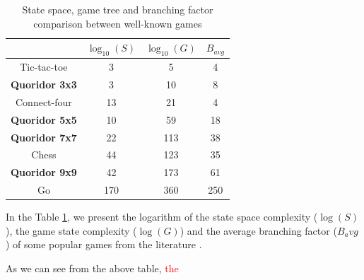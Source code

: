 \begin{table}[ht]
    \centering
     \begin{tabular}{|c|c|c|c|}\hline
          & $\log_{10}(S)$ & $\log_{10}(G)$ & $B_{avg}$\\ \hline 
          Tic-tac-toe  & 3   & 5   & 4    \\ \hline
  \textbf{Quoridor 3x3} & 3  & 10  & 8  \\ \hline
          Connect-four & 13  & 21  & 4    \\ \hline
  \textbf{Quoridor 5x5} & 10  & 59 & 18  \\ \hline
  \textbf{Quoridor 7x7}  & 22  & 113 & 38  \\ \hline
          Chess        & 44  & 123 & 35   \\ \hline
  \textbf{Quoridor 9x9}     & 42  & 173 & 61  \\ \hline        
          Go           & 170 & 360 & 250 \\ \hline
     \end{tabular}
     \caption{State space, game tree and branching factor comparison between well-known games}
     \label{tab:comparison}
 \end{table}

 In the Table \ref{tab:comparison}, we present the logarithm of the state space complexity ($\log(S)$), the game state complexity ($\log(G)$) and the average branching factor ($B_avg$) of some popular games from the literature \citep{Mertens2006Quoridor}.

 As we can see from the above table, \textcolor{red}{the} 